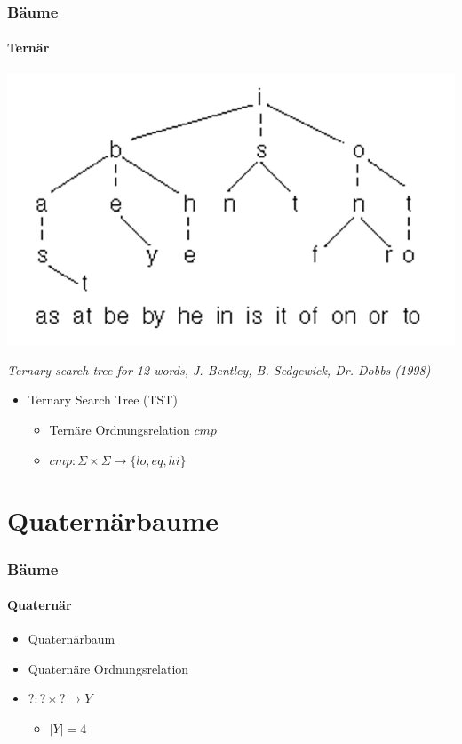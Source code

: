 \documentclass{beamer}
\begin{document}
\begin{frame}
  \frametitle{Bäume}
  \framesubtitle{Ternär}
  \begin{center}
    \includegraphics[scale=0.5]{rsrc/tst}
    
    \tiny \it Ternary search tree for 12 words, J. Bentley, B. Sedgewick, Dr. Dobbs (1998)
  \end{center}
  \begin{itemize}
    \item Ternary Search Tree (TST)
    \begin{itemize}
      \item Ternäre Ordnungsrelation $cmp$
      \item $cmp:\Sigma \times \Sigma \rightarrow \{lo,eq,hi\}$
    \end{itemize}
  \end{itemize}
\end{frame}

\section{Quaternärbaume}

\begin{frame}
  \frametitle{Bäume}
  \framesubtitle{Quaternär}
  \begin{itemize}
    \item Quaternärbaum
    \item Quaternäre Ordnungsrelation
    \item $?:? \times ? \rightarrow Y$
    \begin{itemize}
      \item $|Y| = 4$
    \end{itemize}
  \end{itemize}
\end{frame}
\end{document}
